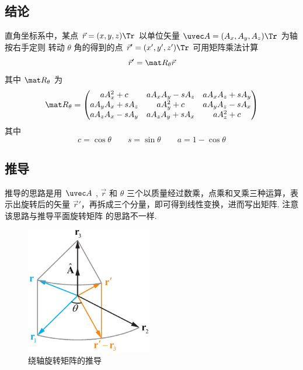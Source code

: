 
\subsection{结论}
直角坐标系中，某点 $\vec r=(x,y,z)\Tr$ 以单位矢量 $\uvec A=(A_x, A_y, A_z)\Tr$ 为轴按右手定则%
转动 $\theta$ 角的得到的点 $\vec r'=(x',y',z')\Tr$ 可用矩阵乘法计算
\begin{equation}
\vec r' = \mat R_\theta \vec r
\end{equation}
其中 $\mat R_\theta$ 为
\begin{equation}
\mat R_\theta =
\begin{pmatrix}
a A_x^2 + c & a A_x A_y - s A_z & a A_x A_z + s A_y\\
a A_y A_x + s A_z & a A_y^2 + c & a A_y A_z - s A_x\\
a A_z A_x - s A_y & a A_z A_y + s A_x & a A_z^2 + c
\end{pmatrix}\end{equation}
其中
\begin{equation}
c = \cos\theta \qquad s = \sin\theta \qquad a = 1 - \cos\theta
\end{equation}

\subsection{推导}
推导的思路是用 $\uvec A$ , $\vec r$ 和 $\theta $ 三个以质量经过数乘，点乘和叉乘三种运算，表示出旋转后的矢量 $\vec r'$，再拆成三个分量，即可得到线性变换，进而写出矩阵. 注意该思路与推导平面旋转矩阵 的思路不一样.
\begin{figure}[ht]
\centering
\includegraphics[width=5.5cm]{./figures/RotA1.pdf}
\caption{绕轴旋转矩阵的推导}
\end{figure} 

